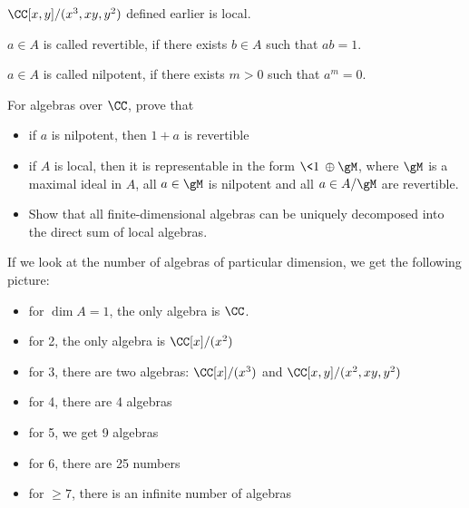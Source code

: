 \documentclass[11pt]{scrartcl}
\begin{document}
  \begin{example}

    $\CC[x, y]/ (x^{3}, xy, y^{2})$ defined earlier is local.

  \end{example}

  \begin{definition}
    $a\in A$ is called revertible, if there exists $b \in A$ such that
    $ab = 1$.
  \end{definition}

  \begin{definition}
    $a\in A$ is called nilpotent, if there exists $m > 0$ such that
    $a^{m} = 0$.
  \end{definition}

  \begin{problem*}
    \hfill

    For algebras over $\CC$, prove that
    \begin{itemize}
    \item if $a$ is nilpotent, then $1+a$ is revertible
    \item if $A$ is local, then it is representable in the form
      $\<1\> \oplus \gM$, where $\gM$ is a maximal ideal in $A$, all
      $a\in \gM$ is nilpotent and all $a\in A/ \gM$ are revertible.
    \item Show that all finite-dimensional algebras can be uniquely
      decomposed into the direct sum of local algebras.
    \end{itemize}
  \end{problem*}

  If we look at the number of algebras of particular dimension, we get
  the following picture:

  \begin{itemize}
  \item for $\dim A = 1$, the only algebra is $\CC$.
  \item for 2, the only algebra is $\CC[x]/ (x^{2})$
  \item for 3, there are two algebras: $\CC[x]/ (x^{3})$ and
    $\CC[x, y]/ (x^{2}, xy, y^{2})$
  \item for 4, there are 4 algebras
  \item for 5, we get 9 algebras
  \item for 6, there are 25 numbers
  \item for $\geq 7$, there is an infinite number of algebras
  \end{itemize}
\end{document}
